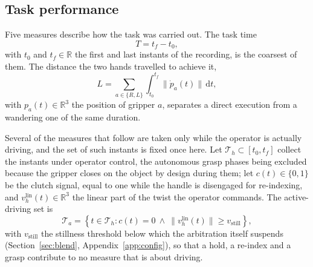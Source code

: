 \documentclass[12pt,a4paper,twoside,openright]{report}
\begin{document}
\subsection{Task performance}
\label{sec:resperf}

Five measures describe how the task was carried out. The task time
\begin{equation}
T = t_f - t_0,
\label{eq:mT}
\end{equation}
with $t_0$ and $t_f \in \mathbb{R}$ the first and last instants of the recording, is the coarsest of them. The distance the two hands travelled to achieve it,
\begin{equation}
L = \sum_{a \in \{R,L\}} \int_{t_0}^{t_f} \lVert \dot{p}_a(t) \rVert \, \mathrm{d}t,
\label{eq:mL}
\end{equation}
with $p_a(t) \in \mathbb{R}^3$ the position of gripper $a$, separates a direct execution from a wandering one of the same duration.

Several of the measures that follow are taken only while the operator is actually driving, and the set of such instants is fixed once here. Let $\mathcal{T}_h \subset [t_0,t_f]$ collect the instants under operator control, the autonomous grasp phases being excluded because the gripper closes on the object by design during them; let $c(t) \in \{0,1\}$ be the clutch signal, equal to one while the handle is disengaged for re-indexing, and $v_h^{\mathrm{lin}}(t) \in \mathbb{R}^3$ the linear part of the twist the operator commands. The active-driving set is
\begin{equation}
\mathcal{T}_a = \left\{ t \in \mathcal{T}_h : c(t) = 0 \ \wedge\ \lVert v_h^{\mathrm{lin}}(t) \rVert \ge v_{\text{still}} \right\},
\label{eq:Ta}
\end{equation}
with $v_{\text{still}}$ the stillness threshold below which the arbitration itself suspends (Section~\ref{sec:blend}, Appendix~\ref{app:config}), so that a hold, a re-index and a grasp contribute to no measure that is about driving.
\end{document}
